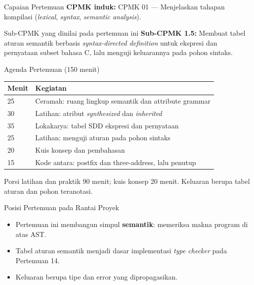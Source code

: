 \documentclass[aspectratio=169,10pt,t]{beamer}
\begin{document}

\begin{frame}{Capaian Pertemuan}
  \textbf{CPMK induk:} CPMK 01 --- Menjelaskan tahapan kompilasi
  (\textit{lexical}, \textit{syntax}, \textit{semantic analysis}).

  \vspace{3pt}
  \begin{block}{Sub-CPMK yang dinilai pada pertemuan ini}
    \small
    \textbf{Sub-CPMK 1.5:} Membuat tabel aturan semantik berbasis
    \textit{syntax-directed definition} untuk ekspresi dan pernyataan
    subset bahasa C, lalu menguji keluarannya pada pohon sintaks.
  \end{block}
\end{frame}

\begin{frame}{Agenda Pertemuan (150 menit)}
  \small
  \begin{tabular}{@{}p{1.4cm}p{12.3cm}@{}}
    \toprule
    \textbf{Menit} & \textbf{Kegiatan} \\
    \midrule
    25 & Ceramah: ruang lingkup semantik dan attribute grammar \\
    30 & Latihan: atribut \textit{synthesized} dan \textit{inherited} \\
    35 & Lokakarya: tabel SDD ekspresi dan pernyataan \\
    25 & Latihan: menguji aturan pada pohon sintaks \\
    20 & Kuis konsep dan pembahasan \\
    15 & Kode antara: postfix dan three-address, lalu penutup \\
    \bottomrule
  \end{tabular}

  \vspace{6pt}
  {\scriptsize\color{ubbblue!75}Porsi latihan dan praktik 90 menit;
  kuis konsep 20 menit. Keluaran berupa tabel aturan dan pohon
  teranotasi.}
\end{frame}

\begin{frame}{Posisi Pertemuan pada Rantai Proyek}

  \vspace{2pt}
  \begin{itemize}
    \item Pertemuan ini membangun simpul \textbf{semantik}: memeriksa
          makna program di atas AST.
    \item Tabel aturan semantik menjadi dasar implementasi
          \textit{type checker} pada Pertemuan 14.
    \item Keluaran berupa tipe dan error yang dipropagasikan.
  \end{itemize}
\end{frame}
\end{document}
